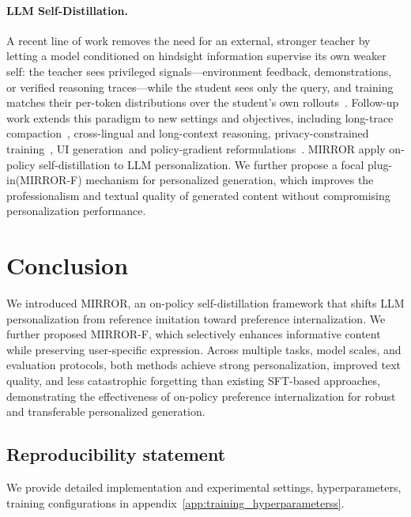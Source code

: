 \documentclass{article} %
\begin{document}
\paragraph{LLM Self-Distillation.} A recent line of work removes the need for an external, stronger teacher by letting a model conditioned on hindsight information supervise its own weaker self: the teacher
sees privileged signals---environment feedback, demonstrations, or verified reasoning
traces---while the student sees only the query, and training matches their per-token
distributions over the student's own rollouts~\citep{SDPO,OPDpersona,SDFT}. Follow-up work extends
this paradigm to new settings and objectives, including long-trace compaction~\citep{OPSDC},
cross-lingual and long-context reasoning, privacy-constrained training~\citep{OPSDL}, UI generation~\citep{SDPO-UI}and
policy-gradient reformulations~\citep{SDPG}. MIRROR apply on-policy self-distillation to LLM personalization. We further propose a focal plug-in(MIRROR-F) mechanism for personalized generation, which improves the professionalism and textual quality of generated content without compromising personalization performance.
\section{Conclusion}

We introduced MIRROR, an on-policy self-distillation framework that shifts LLM personalization from reference imitation toward preference internalization. We further proposed MIRROR-F, which selectively enhances informative content while preserving user-specific expression. Across multiple tasks, model scales, and evaluation protocols, both methods achieve strong personalization, improved text quality, and less catastrophic forgetting than existing SFT-based approaches, demonstrating the effectiveness of on-policy preference internalization for robust and transferable personalized generation.


\subsection*{Reproducibility statement}

We provide detailed implementation and experimental settings, hyperparameters, training configurations in appendix~\ref{app:training_hyperparameterss}. 
\end{document}

